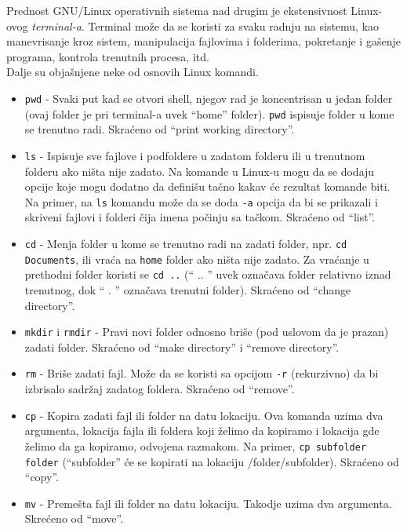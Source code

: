 Prednost GNU/Linux operativnih sistema nad drugim je ekstensivnost Linux-ovog \textit{terminal-a}. Terminal može da se koristi za svaku radnju na sistemu, kao manevrisanje kroz sistem, manipulacija fajlovima i folderima,  pokretanje i gašenje programa, kontrola trenutnih procesa, itd.\\
Dalje su objašnjene neke od osnovih Linux komandi.
\begin{itemize}
\item \texttt{pwd} - Svaki put kad se otvori shell, njegov rad je koncentrisan u jedan folder (ovaj folder je pri terminal-a uvek ``home'' folder). \texttt{pwd} ispisuje folder u kome se trenutno radi. Skraćeno od ``print working directory''. 

\item \texttt{ls} - Ispisuje sve fajlove i podfoldere u zadatom folderu ili u trenutnom folderu ako ništa nije zadato. Na komande u Linux-u mogu da se dodaju opcije koje mogu dodatno da definišu tačno kakav će rezultat komande biti. Na primer, na \texttt{ls} komandu može da se doda \texttt{-a} opcija da bi se prikazali i skriveni fajlovi i folderi čija imena počinju sa tačkom. Skraćeno od ``list''.

\item \texttt{cd} - Menja folder u kome se trenutno radi na zadati folder, npr. \texttt{cd Documents}, ili vraća na \texttt{home} folder ako ništa nije zadato. Za vraćanje u prethodni folder koristi se \texttt{cd ..} (`` .. '' uvek označava folder relativno iznad trenutnog, dok `` . '' označava trenutni folder). Skraćeno od ``change directory''.

\item \texttt{mkdir} i \texttt{rmdir} - Pravi novi folder odnosno briše (pod uslovom da je prazan) zadati folder. Skraćeno od ``make directory'' i ``remove directory''.

\item \texttt{rm} - Briše zadati fajl. Može da se koristi sa opcijom \texttt{-r} (rekurzivno) da bi izbrisalo sadržaj zadatog foldera. Skraćeno od ``remove''.

\item \texttt{cp} - Kopira zadati fajl ili folder na datu lokaciju. Ova komanda uzima dva argumenta, lokacija fajla ili foldera koji želimo da kopiramo i lokacija gde želimo da ga kopiramo, odvojena razmakom. Na primer, \texttt{cp subfolder folder} (``subfolder'' će se kopirati na lokaciju /folder/subfolder). Skraćeno od ``copy''.

\item \texttt{mv} - Premešta fajl ili folder na datu lokaciju. Takodje uzima dva argumenta. Skrećeno od ``move''.


\end{itemize}
